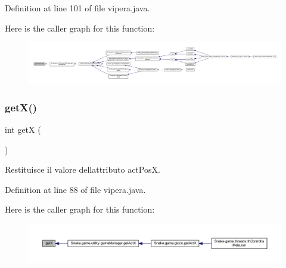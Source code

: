 Definition at line 101 of file vipera.\+java.

Here is the caller graph for this function\+:
\nopagebreak
\begin{figure}[H]
\begin{center}
\leavevmode
\includegraphics[width=350pt]{class_snake_1_1game_1_1vipera_1_1vipera_acda812adf1e0abdaf30cf3a2e2efaa07_icgraph}
\end{center}
\end{figure}
\mbox{\label{class_snake_1_1game_1_1vipera_1_1vipera_ae13f88e922e1339355456062ad9fa359}} 
\subsubsection{\texorpdfstring{get\+X()}{getX()}}
{\footnotesize\ttfamily int getX (\begin{DoxyParamCaption}{ }\end{DoxyParamCaption})}



Restituisce il valore dell\textquotesingle{}attributo act\+PosX. 



Definition at line 88 of file vipera.\+java.

Here is the caller graph for this function\+:
\nopagebreak
\begin{figure}[H]
\begin{center}
\leavevmode
\includegraphics[width=350pt]{class_snake_1_1game_1_1vipera_1_1vipera_ae13f88e922e1339355456062ad9fa359_icgraph}
\end{center}
\end{figure}
\mbox{\label{class_snake_1_1game_1_1vipera_1_1vipera_ac25c5b310cb26c05d5ea69485d1e155f}} 
